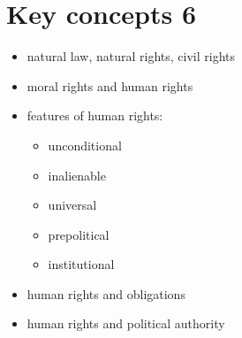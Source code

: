 \section{Key concepts 6}

\begin{itemize}
	\item natural law, natural rights, civil rights
	\item moral rights and human rights
	\item features of human rights:
	\begin{itemize}
		\item unconditional
		\item inalienable
		\item universal
		\item prepolitical
		\item institutional
	\end{itemize}
	\item human rights and obligations
	\item human rights and political authority
\end{itemize}
